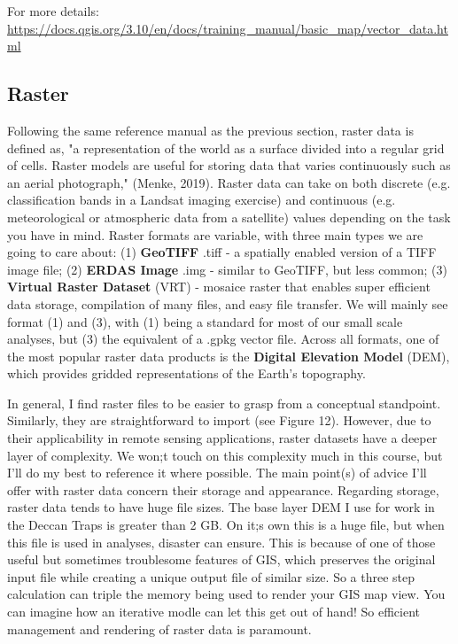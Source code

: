 \documentclass{article}
\begin{document}
For more details: \url{https://docs.qgis.org/3.10/en/docs/training_manual/basic_map/vector_data.html}

\subsection{Raster}

Following the same reference manual as the previous section, raster data is defined as, "a representation of the world as a surface divided into a regular grid of cells. Raster models are useful for storing data that varies continuously such as an aerial photograph," (Menke, 2019). Raster data can take on both discrete (e.g. classification bands in a Landsat imaging exercise) and continuous (e.g. meteorological or atmospheric data from a satellite) values depending on the task you have in mind. Raster formats are variable, with three main types we are going to care about: (1) \textbf{GeoTIFF} .tiff - a spatially enabled version of a TIFF image file; (2) \textbf{ERDAS Image} .img - similar to GeoTIFF, but less common; (3) \textbf{Virtual Raster Dataset} (VRT) - mosaice raster that enables super efficient data storage, compilation of many files, and easy file transfer. We will mainly see format (1) and (3), with (1) being a standard for most of our small scale analyses, but (3) the equivalent of a .gpkg vector file. Across all formats, one of the most popular raster data products is the \textbf{Digital Elevation Model} (DEM), which provides gridded representations of the Earth's topography. 

In general, I find raster files to be easier to grasp from a conceptual standpoint. Similarly,  they are straightforward to import (see Figure 12). However, due to their applicability in remote sensing applications, raster datasets have a deeper layer of complexity. We won;t touch on this complexity much in this course, but I'll do my best to reference it where possible. The main point(s) of advice I'll offer with raster data concern their storage and appearance. Regarding storage, raster data tends to have huge file sizes. The base layer DEM I use for work in the Deccan Traps is greater than 2 GB. On it;s own this is a huge file, but when this file is used in analyses, disaster can ensure. This is because of one of those useful but sometimes troublesome features of GIS, which preserves the original input file while creating a unique output file of similar size. So a three step calculation can triple the memory being used to render your GIS map view. You can imagine how an iterative modle can let this get out of hand! So efficient management and rendering of raster data is paramount. 
\end{document}
